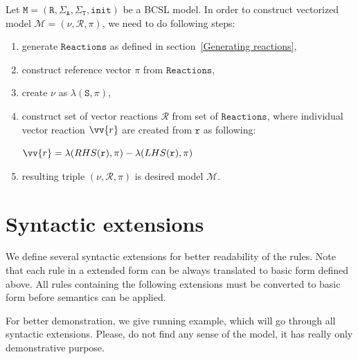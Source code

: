 \documentclass[12pt]{fithesis2}
\begin{document}
Let $\mathtt{M} = (\mathtt{R}, \Sigma_\mathtt{A}, \Sigma_\mathtt{T}, \mathtt{init})$ be a BCSL model. In order to construct vectorized model $\mathcal{M} = (\nu, \mathcal{R}, \pi)$, we need to do following steps:

\begin{enumerate}
\item generate $\mathtt{Reactions}$ as defined in section~\ref{Generating reactions},
\item construct reference vector $\pi$ from $\mathtt{Reactions}$,
\item create $\nu$ as $\lambda(\mathtt{S}, \pi)$,
\item construct set of vector reactions $\mathcal{R}$ from set of $\mathtt{Reactions}$, where individual vector reaction $\vv{r}$ are created from $\mathtt{r}$ as following:

\begin{center}
$\vv{r} = \lambda(RHS(\mathtt{r}), \pi) - \lambda(LHS(\mathtt{r}), \pi)$
\end{center}

\item resulting triple $(\nu, \mathcal{R}, \pi)$ is desired model $\mathcal{M}$.
\end{enumerate}

\section{Syntactic extensions}

We define several syntactic extensions for better readability of the rules. Note that each rule in a extended form can be always translated to basic form defined above. All rules containing the following extensions must be converted to basic form before semantics can be applied.

For better demonstration, we give running example, which will go through all syntactic extensions. Please, do not find any sense of the model, it has really only demonstrative purpose.
\end{document}
